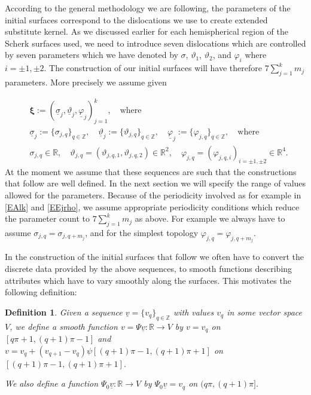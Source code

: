 \documentclass[12pt,namelimits,sumlimits]{amsart}
\newtheorem{definition}[theorem]{Definition}
\theoremstyle{remark}
\numberwithin{equation}{section}
\begin{document}
According to the general methodology we are following,
the parameters of the initial surfaces correspond to the dislocations
we use to create extended substitute kernel.
As we discussed earlier for each hemispherical region of the Scherk surfaces used,
we need to introduce seven dislocations
which are controlled by seven parameters 
which we have denoted by $\sigma$, $\vartheta_1$, $\vartheta_2$, and $\varphi_i$ where ${{i=\pm1,\pm2}}$.
The construction of our initial surfaces will have therefore $7\sum_{j=1}^k m_j$
parameters.
More precisely we assume given
\addtocounter{theorem}{1}
\begin{equation}
\label{Exibo}
\begin{aligned}
&{{\boldsymbol{\xi}}}:= (\underline{\sigma}_j,\underline{\vartheta}_j,\underline{\varphi}_j)_{j=1}^k,
\quad\text{where}\quad
\\
&\underline{\sigma}_j :=  \{ {\sigma}_{{j,q}} \}_{q\in{\mathbb{Z}}},
\quad
\underline{\vartheta}_j := \{ {\vartheta}_{{j,q}} \}_{q\in{\mathbb{Z}}},
\quad
\underline{\varphi}_j := \{ {\varphi}_{{j,q}} \}_{q\in{\mathbb{Z}}},
\quad\text{where}\quad
\\
&\sigma_{{j,q}}\in{\mathbb{R}},
\quad
\vartheta_{{j,q}}= (\vartheta_{{{j,q}},1},\vartheta_{{{j,q}},2}) \in{{{\mathbb{R}}^2}},
\quad
\varphi_{{j,q}}= (\varphi_{{{j,q}},i})_{{i=\pm1,\pm2}}\in{{{\mathbb{R}}^4}}.
\end{aligned}
\end{equation}
At the moment we assume that these sequences are such that the constructions that follow are well defined.
In the next section we will specify the range of values allowed for the parameters.
Because of the periodicity involved as for example in \ref{EAlk} and \ref{EEjrho},
we assume appropriate periodicity conditions which reduce the parameter count to $7\sum_{j=1}^k m_j$
as above.
For example we always have to assume $\sigma_{{j,q}}=\sigma_{j,q+m_j}$,
and for the simplest topology $\varphi_{{j,q}}=\varphi_{j,q+m_j}$.

In the construction of the initial surfaces that follow
we often have to convert the discrete data provided by the above sequences,
to smooth functions describing attributes which have to vary smoothly along the surfaces.
This motivates the following definition:

\addtocounter{equation}{1}
\begin{definition}
\label{DPsi}
Given a sequence $\underline{v}=\{v_q\}_{q\in{\mathbb{Z}}}$ with values $v_q$ in some vector space $V$,
we define a smooth function $v=\Psi\underline{v}:{\mathbb{R}}\to V$ by
$v=v_q$ on $[q\pi+1,(q+1)\pi-1]$
and
$v=v_q+(v_{q+1}-v_q)\psi[(q+1)\pi-1,(q+1)\pi+1]$ on $[(q+1)\pi-1,(q+1)\pi+1]$.

We also define a function $\Psi_0\underline{v}:{\mathbb{R}}\to V$ by $\Psi_0\underline{v}=v_q$ on $(q\pi,(q+1)\pi]$.
\end{definition}
\end{document}
